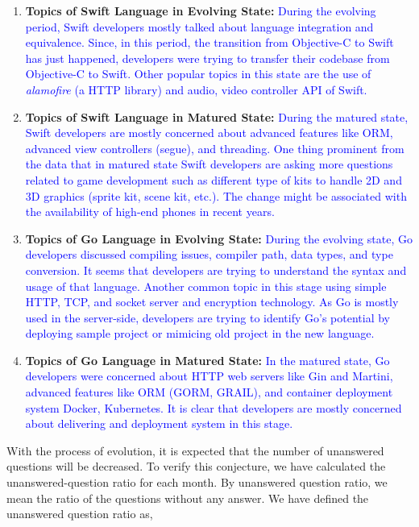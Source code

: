 \begin{enumerate}
\item \textbf{Topics of Swift Language in Evolving State:} \textcolor{blue}{During the evolving period, Swift developers mostly talked about language integration and equivalence. Since, in this period, the transition from Objective-C to Swift has just happened, developers were trying to transfer their codebase from Objective-C to Swift. Other popular topics in this state are the use of \emph{alamofire} (a HTTP library) and audio, video controller API of Swift.}
\item \textbf{Topics of Swift Language in Matured State:} \textcolor{blue}{During the matured state, Swift developers are  mostly concerned about advanced features like ORM, advanced view controllers (segue), and threading. One thing prominent from the data that in matured state Swift developers are asking more questions related to game development such as different type of kits to handle 2D and 3D graphics (sprite kit, scene kit, etc.). The change might be associated with the availability of high-end phones in recent years.\citep{Aleem2016,Gavalas2011}}
\item \textbf{Topics of Go Language in Evolving State:} \textcolor{blue}{During the evolving state, Go developers discussed compiling issues, compiler path, data types, and type conversion. It seems that developers are trying to understand the syntax and usage of that language. Another common topic in this stage using simple HTTP, TCP, and socket server and encryption technology. As Go is mostly used in the server-side, developers are trying to identify Go's potential by deploying sample project or mimicing old project in the new language.}

\item \textbf{Topics of Go Language in Matured State:} \textcolor{blue}{In the matured state, Go developers were concerned about HTTP web servers like Gin and  Martini, advanced features like ORM (GORM, GRAIL), and container deployment system Docker, Kubernetes. It is clear that developers are mostly concerned about delivering and deployment system  in this stage.}
\end{enumerate}

With the process of evolution, it is expected that the number of unanswered questions will be decreased. To verify this conjecture, we have calculated the unanswered-question ratio for each month. By unanswered question ratio, we mean the ratio of the questions without any answer. We have defined the unanswered question ratio as,

